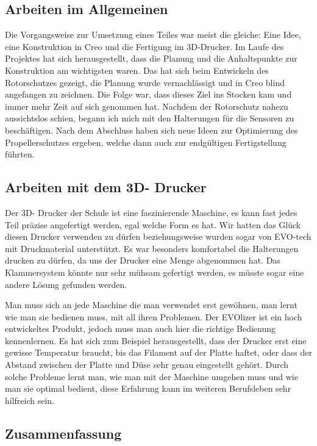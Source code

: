 	\subsection{Arbeiten im Allgemeinen}

	Die Vorgangsweise zur Umsetzung eines Teiles war meist die gleiche: Eine Idee, eine Konstruktion in Creo und die Fertigung im 3D-Drucker.
	Im Laufe des Projektes hat sich herausgestellt, dass die Planung und die Anhaltspunkte zur Konstruktion am wichtigsten waren.
	Das hat sich beim Entwickeln des Rotorschutzes gezeigt, die Planung wurde vernachlässigt und in Creo blind angefangen zu zeichnen.
	Die Folge war, dass dieses Ziel ins Stocken kam und immer mehr Zeit auf sich genommen hat.
	Nachdem der Rotorschutz nahezu aussichtslos schien, begann ich mich mit den Halterungen für die Sensoren zu beschäftigen.
	Nach dem Abschluss haben sich neue Ideen zur Optimierung des Propellerschutzes ergeben, welche dann auch zur endgültigen Fertigstellung führten.

	\subsection{Arbeiten mit dem 3D- Drucker}

	Der 3D- Drucker der Schule ist eine faszinierende Maschine, es kann fast jedes Teil präzise angefertigt werden, egal welche Form es hat.
	Wir hatten das Glück diesen Drucker verwenden zu dürfen beziehungsweise wurden sogar von EVO-tech mit Druckmaterial unterstützt.
	Es war besonders komfortabel die Halterungen drucken zu dürfen, da uns der Drucker eine Menge abgenommen hat.
	Das Klammersystem könnte nur sehr mühsam gefertigt werden, es müsste sogar eine andere Lösung gefunden werden.

	Man muss sich an jede Maschine die man verwendet erst gewöhnen, man lernt wie man sie bedienen muss, mit all ihren Problemen.
	Der EVOlizer ist ein hoch entwickeltes Produkt, jedoch muss man auch hier die richtige Bedienung kennenlernen.
	Es hat sich zum Beispiel herausgestellt, dass der Drucker erst eine gewisse Temperatur braucht, bis das Filament auf der Platte haftet, oder dass der Abstand zwischen der Platte und Düse sehr genau eingestellt gehört.
	Durch solche Probleme lernt man, wie man mit der Maschine umgehen muss und wie man sie optimal bedient, diese Erfahrung kann im weiteren Berufsleben sehr hilfreich sein.

			\newpage

	\subsection{Zusammenfassung}

